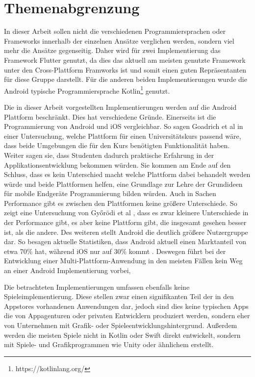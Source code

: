 \section{Themenabgrenzung}
\label{cha:3_3abgrenzung}
In dieser Arbeit sollen nicht die verschiedenen Programmiersprachen oder Frameworks innerhalb der einzelnen Ansätze verglichen werden, sondern viel mehr die Ansätze gegenseitig. Daher wird für zwei Implementierung das Framework Flutter genutzt, da dies das aktuell am meisten genutzte Framework\cite{statist_CP_Framework} unter den Cross-Plattform Framworks ist und somit einen guten Repräsentanten für diese Gruppe darstellt. Für die anderen beiden Implementierungen wurde die Android typische Programmiersprache Kotlin\footnote{https://kotlinlang.org/} genutzt. 

Die in dieser Arbeit vorgestellten Implementierungen werden auf die Android Plattform beschränkt. 
Dies hat verschiedene Gründe. Einerseits ist die Programmierung von Android und iOS vergleichbar.
So sagen Goadrich et al \cite{iOSvsAndroid} in einer Untersuchung, welche Plattform für einen Universitätskurs passend wäre, dass beide Umgebungen die für den Kurs benötigten Funktionalität haben.
Weiter sagen sie, dass Studenten dadurch praktische Erfahrung in der Applikationsentwicklung bekommen würden. Sie kommen am Ende auf den Schluss, dass es kein Unterschied macht welche Plattform dabei behandelt werden würde und beide Plattformen helfen, eine Grundlage zur Lehre der Grundideen für mobile Endgeräte Programmierung bilden würden.
Auch in Sachen Performance gibt es zwischen den Plattformen keine größere Unterschiede. So zeigt eine Untersuchung von Győrödi et al \cite{Android_IOS_Performance_comparison}, dass es zwar kleinere Unterschiede in der Performance gibt, es aber keine Plattform gibt, die insgesamt gesehen besser ist, als die andere.
Des weiteren stellt Android die deutlich größere Nutzergruppe dar. So besagen aktuelle Statistiken, dass Android aktuell einen Marktanteil von etwa 70\% hat, während iOS nur auf 30\% kommt \cite{statist_OS_worldwide}. Deswegen führt bei der Entwicklung einer Multi-Plattform-Anwendung in den meisten Fällen kein Weg an einer Android Implementierung vorbei, 

Die betrachteten Implementierungen umfassen ebenfalls keine Spieleimplementierung. Diese stellen zwar einen signifikanten Teil der in den Appstores vorhandenen Anwendungen dar, jedoch sind dies keine typischen Apps die von Appagenturen oder privaten Entwicklern produziert werden, sondern eher von Unternehmen mit Grafik- oder Spieleentwicklungshintergrund. Außerdem werden die meisten Spiele nicht in Kotlin oder Swift direkt entwickelt, sondern mit Spiele- und Grafikprogrammen wie Unity oder ähnlichem erstellt.
